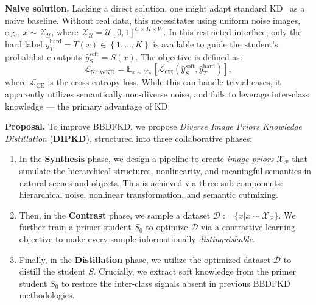 \begin{foldable} %
    \textbf{Naive solution.}
    Lacking a direct solution, one might adapt standard KD~\cite{hinton2015distilling} as a naive baseline.
    Without real data, this necessitates using uniform noise images, e.g., $x\sim\mathcal{X}_{\mathcal{U}}$, where $\mathcal{X}_{\mathcal{U}}=\mathcal{U}\left[0,1\right]^{C\times H\times W}$.
    In this restricted interface, only the hard label $\hat{y}_{T}^\text{hard}=T(x)\in\left\{ 1,\ldots,K\right\}$ is available to guide the student's probabilistic outputs $\hat{y}_{S}^\text{soft}=S\left(x\right)$.
    The objective is defined as:
    \begin{equation} \label{ch4:eq:loss-naive-kd}
        \mathcal{L}_{\text{NaiveKD}}=\mathbb{E}_{x\sim\mathcal{X}_{\mathcal{U}}}\left[\mathcal{L}_{\text{CE}}\left(\hat{y}_{S}^\text{soft},\hat{y}_{T}^\text{hard}\right)\right],
    \end{equation}
    where $\mathcal{L}_{\text{CE}}$ is the cross-entropy loss.
    While this can handle trivial cases, it apparently utilizes semantically non-diverse noise, and fails to leverage inter-class knowledge --- the primary advantage of KD.
\end{foldable}

\begin{foldable} %
    \textbf{Proposal.}
    To improve BBDFKD, we propose \textit{Diverse Image Priors Knowledge Distillation} (\textbf{DIPKD}), structured into three collaborative phases:
    \begin{enumerate}
        \item
            In the \textbf{Synthesis} phase, we design a pipeline to create \textit{image priors} $\mathcal{X}_\mathcal{P}$ that simulate the hierarchical structures, nonlinearity, and meaningful semantics in natural scenes and objects.
            This is achieved via three sub-components: hierarchical noise, nonlinear transformation, and semantic cutmixing.
        \item
            Then, in the \textbf{Contrast} phase, we sample a dataset $\mathcal{D} := \{x|x\sim\mathcal{X}_\mathcal{P}\}$.
            We further train a primer student $S_0$ to optimize $\mathcal{D}$ via a contrastive learning objective to make every sample informationally \textit{distinguishable}.
        \item
            Finally, in the \textbf{Distillation} phase, we utilize the optimized dataset $\mathcal{D}$ to distill the student $S$.
            Crucially, we extract soft knowledge from the primer student $S_0$ to restore the inter-class signals absent in previous BBDFKD methodologies.
    \end{enumerate}
\end{foldable}



